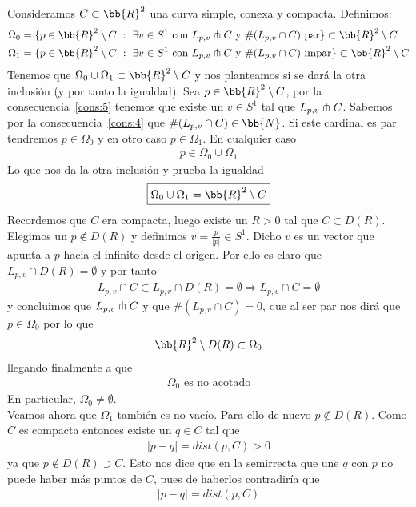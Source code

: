 Consideramos $C\subset \bb{R}^2$ una curva simple, conexa y compacta. Definimos:
\begin{align*}
    \Omega_0 &= \{p\in \bb{R}^2 \setminus C \ : \ \exists v \in S^1 \text{ con } L_{p,v}\transv C \text{ y } \#(L_{p,v} \cap C) \text{ par}\} \subset \bb{R}^2 \setminus C\notag\\
    \Omega_1 &= \{p\in \bb{R}^2 \setminus C \ : \ \exists v \in S^1 \text{ con } L_{p,v}\transv C \text{ y } \#(L_{p,v} \cap C) \text{ impar}\} \subset \bb{R}^2 \setminus C
\end{align*}
Tenemos que $\Omega_0 \cup \Omega_1 \subset \bb{R}^2 \setminus C$ y nos planteamos si se dará la otra inclusión (y por tanto la igualdad). Sea $p\in \bb{R}^2 \setminus C$, por la consecuencia~\ref{cons:5} tenemos que existe un $v\in S^1$ tal que $L_{p,v} \pitchfork C$. Sabemos por la consecuencia~\ref{cons:4} que $\#(L_{p,v}\cap C) \in \bb{N}$. Si este cardinal es par tendremos $p\in \Omega_0$ y en otro caso $p\in \Omega_1$. En cualquier caso
\begin{gather*}
    p\in \Omega_0\cup\Omega_1
\end{gather*}
Lo que nos da la otra inclusión y prueba la igualdad
\begin{gather*}
    \boxed{\Omega_0\cup\Omega_1 = \bb{R}^2 \setminus C}
\end{gather*}
Recordemos que $C$ era compacta, luego existe un $R>0$ tal que $C\subset D(R)$. Elegimos un $p\notin D(R)$ y definimos $v=\frac{p}{|p|}\in S^1$. Dicho $v$ es un vector que apunta a $p$ hacia el infinito desde el origen. Por ello es claro que $L_{p,v}\cap D(R) = \emptyset$ y por tanto
\begin{gather*}
    L_{p,v}\cap C \subset L_{p,v}\cap D(R) = \emptyset \Rightarrow L_{p,v}\cap C = \emptyset
\end{gather*}
y concluimos que $L_{p,v} \pitchfork C$ y que $\#(L_{p,v}\cap C)=0$, que al ser par nos dirá que $p\in \Omega_0$ por lo que 
\begin{gather*}
    \bb{R}^2 \setminus D(R)\subset \Omega_0
\end{gather*}
llegando finalmente a que 
\begin{gather*}
    \boxed{\Omega_0 \text{ es no acotado}}
\end{gather*}
En particular, $\boxed{\Omega_0\neq \emptyset}$.\\

Veamos ahora que $\Omega_1$ también es no vacío. Para ello de nuevo $p\notin D(R)$. Como $C$ es compacta entonces existe un $q\in C$ tal que 
\begin{gather*}
    |p-q| = dist(p,C) >0
\end{gather*}
ya que $p\notin D(R) \supset C$. Esto nos dice que en la semirrecta que une $q$ con $p$ no puede haber más puntos de $C$, pues de haberlos contradiría que 
\begin{gather*}
    |p-q| = dist(p,C)
\end{gather*}

